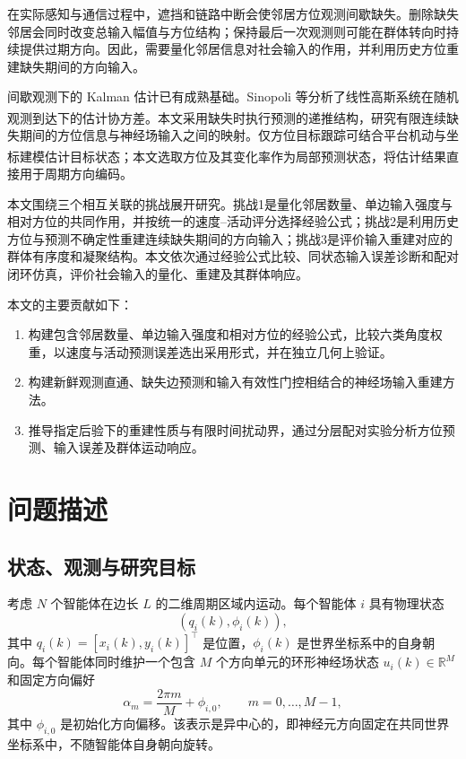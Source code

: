 \documentclass[UTF8,fontset=windows,11pt]{ctexart}
\newcommand{\upcite}[1]{\textsuperscript{\cite{#1}}}
\begin{document}
在实际感知与通信过程中，遮挡和链路中断会使邻居方位观测间歇缺失。删除缺失邻居会同时改变总输入幅值与方位结构；保持最后一次观测则可能在群体转向时持续提供过期方向。因此，需要量化邻居信息对社会输入的作用，并利用历史方位重建缺失期间的方向输入。

间歇观测下的 Kalman 估计已有成熟基础。Sinopoli 等分析了线性高斯系统在随机观测到达下的估计协方差\upcite{Sinopoli2004}。本文采用缺失时执行预测的递推结构，研究有限连续缺失期间的方位信息与神经场输入之间的映射。仅方位目标跟踪可结合平台机动与坐标建模估计目标状态\upcite{Xiourouppa2025}；本文选取方位及其变化率作为局部预测状态，将估计结果直接用于周期方向编码。

本文围绕三个相互关联的挑战展开研究。挑战1是量化邻居数量、单边输入强度与相对方位的共同作用，并按统一的速度--活动评分选择经验公式；挑战2是利用历史方位与预测不确定性重建连续缺失期间的方向输入；挑战3是评价输入重建对应的群体有序度和凝聚结构。本文依次通过经验公式比较、同状态输入误差诊断和配对闭环仿真，评价社会输入的量化、重建及其群体响应。

本文的主要贡献如下：
\begin{enumerate}
\item 构建包含邻居数量、单边输入强度和相对方位的经验公式，比较六类角度权重，以速度与活动预测误差选出采用形式，并在独立几何上验证。
\item 构建新鲜观测直通、缺失边预测和输入有效性门控相结合的神经场输入重建方法。
\item 推导指定后验下的重建性质与有限时间扰动界，通过分层配对实验分析方位预测、输入误差及群体运动响应。
\end{enumerate}

\section{问题描述}

\subsection{状态、观测与研究目标}

考虑 $N$ 个智能体在边长 $L$ 的二维周期区域内运动。每个智能体 $i$ 具有物理状态
\begin{equation}
 (q_i(k),\phi_i(k)),
\end{equation}
其中 $q_i(k)=[x_i(k),y_i(k)]^\top$ 是位置，$\phi_i(k)$ 是世界坐标系中的自身朝向。每个智能体同时维护一个包含 $M$ 个方向单元的环形神经场状态 $u_i(k)\in\mathbb R^M$ 和固定方向偏好
\begin{equation}
 \alpha_m=\frac{2\pi m}{M}+\phi_{i,0},\qquad m=0,\ldots,M-1,
\end{equation}
其中 $\phi_{i,0}$ 是初始化方向偏移。该表示是异中心的，即神经元方向固定在共同世界坐标系中，不随智能体自身朝向旋转。
\end{document}
